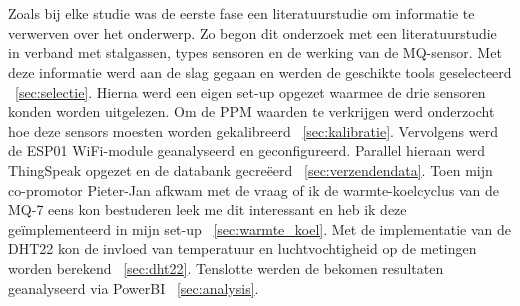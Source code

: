 
\chapter{}%
\label{ch:methodologie}


Zoals bij elke studie was de eerste fase een literatuurstudie om informatie te verwerven over het onderwerp. Zo begon dit onderzoek met een literatuurstudie in verband met stalgassen, types sensoren en de werking van de MQ-sensor. Met deze informatie werd aan de slag gegaan en werden de geschikte tools geselecteerd ~\ref{sec:selectie}. Hierna werd een eigen set-up opgezet waarmee de drie sensoren konden worden uitgelezen. Om de PPM waarden te verkrijgen werd onderzocht hoe deze sensors moesten worden gekalibreerd ~\ref{sec:kalibratie}. Vervolgens werd de ESP01 WiFi-module geanalyseerd en geconfigureerd. Parallel hieraan werd ThingSpeak opgezet en de databank gecreëerd ~\ref{sec:verzendendata}. Toen mijn co-promotor Pieter-Jan afkwam met de vraag of ik de warmte-koelcyclus van de MQ-7 eens kon bestuderen leek me dit interessant en heb ik deze geïmplementeerd in mijn set-up ~\ref{sec:warmte_koel}. Met de implementatie van de DHT22 kon de invloed van temperatuur en luchtvochtigheid op de metingen worden berekend ~\ref{sec:dht22}. Tenslotte werden de bekomen resultaten geanalyseerd via PowerBI ~\ref{sec:analysis}.


